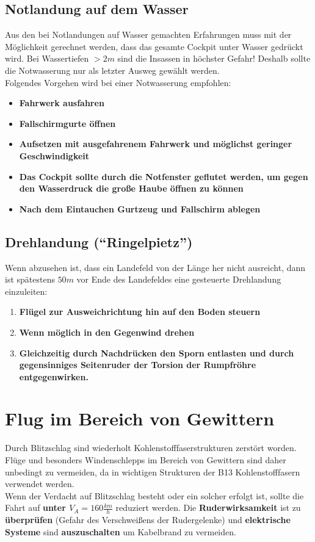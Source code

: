 \subsection{Notlandung auf dem Wasser}
Aus den bei Notlandungen auf Wasser gemachten Erfahrungen muss mit der Möglichkeit gerechnet werden, dass das gesamte Cockpit unter Wasser gedrückt wird. Bei Wassertiefen $>2m$ sind die Insassen in höchster Gefahr! Deshalb sollte die Notwasserung nur als letzter Ausweg gewählt werden.\\
\newline
Folgendes Vorgehen wird bei einer Notwasserung empfohlen:
\begin{itemize}
\item \textbf{Fahrwerk ausfahren}
\item \textbf{Fallschirmgurte öffnen}
\item \textbf{Aufsetzen mit ausgefahrenem Fahrwerk und möglichst geringer Geschwindigkeit}
\item \textbf{Das Cockpit sollte durch die Notfenster geflutet werden, um gegen den Wasserdruck die große Haube öffnen zu können}
\item \textbf{Nach dem Eintauchen Gurtzeug und Fallschirm ablegen}
\end{itemize}

\subsection{Drehlandung ("`Ringelpietz"')}
Wenn abzusehen ist, dass ein Landefeld von der Länge her nicht ausreicht, dann ist spätestens $50m$ vor Ende des Landefeldes eine gesteuerte Drehlandung einzuleiten:
\begin{enumerate}
\item \textbf{Flügel zur Ausweichrichtung hin auf den Boden steuern}
\item \textbf{Wenn möglich in den Gegenwind drehen}
\item \textbf{Gleichzeitig durch Nachdrücken den Sporn entlasten und durch gegensinniges Seitenruder der Torsion der Rumpfröhre entgegenwirken.}

\end{enumerate}


\section{Flug im Bereich von Gewittern}
Durch Blitzschlag sind wiederholt Kohlenstofffaserstrukturen zerstört worden. Flüge und besonders Windenschlepps im Bereich von Gewittern sind daher unbedingt zu vermeiden, da in wichtigen Strukturen der B13 Kohlenstofffasern verwendet werden.\\
Wenn der Verdacht auf Blitzschlag besteht oder ein solcher erfolgt ist, sollte die Fahrt auf \textbf{unter $V_A=160\frac{km}{h}$} reduziert werden. Die \textbf{Ruderwirksamkeit} ist zu \textbf{überprüfen} (Gefahr des Verschweißens der Rudergelenke) und \textbf{elektrische Systeme} sind \textbf{auszuschalten} um Kabelbrand zu vermeiden.

